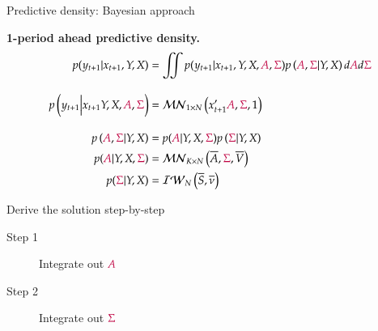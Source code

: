 \documentclass[notes,blackandwhite,mathsans,usenames,dvipsnames]{beamer}
\begin{document}
\begin{frame}{Predictive density: Bayesian approach}

\textbf{1-period ahead predictive density.}\small
\begin{align*} 
p(y_{t+1}|x_{t+1},Y,X) &= \iint p(y_{t+1}|x_{t+1},Y,X,{\color{purple}A},{\color{purple}\Sigma})p\left( {\color{purple}A}, {\color{purple}\Sigma}|Y,X \right) d{\color{purple}A}d {\color{purple}\Sigma}\\[2ex]
p\left(y_{t+1}\Big|x_{t+1}Y,X, {\color{purple}A},{\color{purple}\Sigma}\right) &= \mathcal{MN}_{1\times N}\left( x_{t+1}'{\color{purple}A}, {\color{purple}\Sigma}, 1 \right)\\[2ex]
p\left( {\color{purple}A}, {\color{purple}\Sigma}|Y,X \right) &= p({\color{purple}A}|Y,X,{\color{purple}\Sigma})p\left( {\color{purple}\Sigma}|Y,X \right)\\
p({\color{purple}A}|Y,X,{\color{purple}\Sigma}) &= \mathcal{MN}_{K\times N}\left( \overline{A},{\color{purple}\Sigma},\overline{V} \right)\\
p({\color{purple}\Sigma}|Y,X) &= \mathcal{IW}_N\left( \overline{S}, \overline{\nu} \right)
\end{align*} 

\bigskip\normalsize{\color{mcxs2}Derive the solution step-by-step}
\begin{description}
\item[Step 1] Integrate out ${\color{purple}A}$
\item[Step 2] Integrate out ${\color{purple}\Sigma}$
\end{description}
\end{frame}
\end{document}
